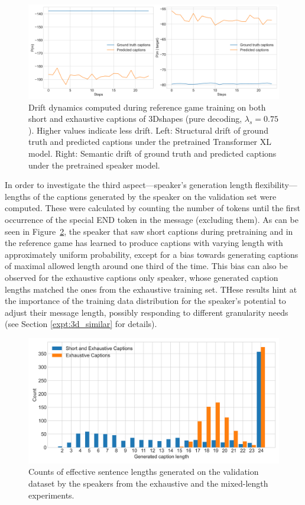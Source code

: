 \begin{figure}
	\centering
	\includegraphics[width=\linewidth]{images/3dshapes_wShort_structural_semantic_drift_49_pure_075_random.png}
	\caption{Drift dynamics computed during reference game training on both short and exhaustive captions of 3Dshapes (pure decoding, $\lambda_s=0.75$). Higher values indicate less drift. Left: Structural drift of ground truth and predicted captions under the pretrained Transformer XL model. Right: Semantic drift of ground truth and predicted captions under the pretrained speaker model.}
	\label{fig:3dshapes_wShort_075_str_sem_drift}
\end{figure}

In order to investigate the third aspect---speaker's generation length flexibility---lengths of the captions generated by the speaker on the validation set were computed. These were calculated by counting the number of tokens until the first occurrence of the special END token in the message (excluding them). As can be seen in Figure~\ref{fig:3dshapes_exh_short_random_lengths}, the speaker that saw short captions during pretraining and in the reference game has learned to produce captions with varying length with approximately uniform probability, except for a bias towards generating captions of maximal allowed length  around one third of the time. This bias can also be observed for the exhaustive captions only speaker, whose generated caption lengths matched the ones from the exhaustive training set. THese results hint at the importance of the training data distribution for the speaker's potential to adjust their message length, possibly responding to different granularity needs (see Section \ref{expt:3d_similar} for details). 

\begin{figure}
	\centering
	\includegraphics[width=0.7\linewidth]{images/3dshapes_exh_short_random_length_counts.png}
	\caption{Counts of effective sentence lengths generated on the validation dataset by the speakers from the exhaustive and the mixed-length experiments.}
	\label{fig:3dshapes_exh_short_random_lengths}
\end{figure}

